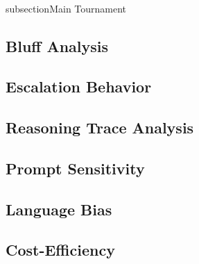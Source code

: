 \\subsection{Main Tournament}



\subsection{Bluff Analysis}


\subsection{Escalation Behavior}


\subsection{Reasoning Trace Analysis}


\subsection{Prompt Sensitivity}


\subsection{Language Bias}


\subsection{Cost-Efficiency}

